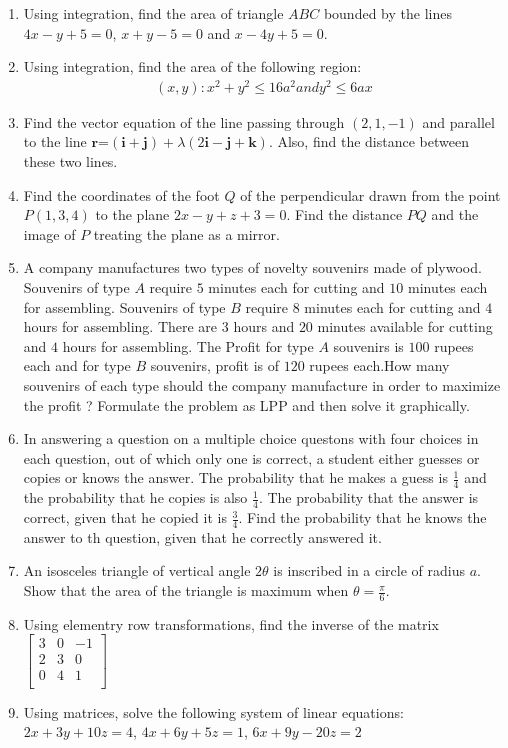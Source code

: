 \documentclass[12pt,-letter paper]{article}
\let\vec\mathbf{}
\let\vec\mathbf{}
\let\vec\mathbf{}
\begin{document}
\begin{enumerate}
\item Using integration, find the area of triangle $ABC$ bounded by the lines $4x-y+5=0$, $x+y-5=0$ and $x-4y+5=0$.

\item Using integration, find the area of the following region:\begin{align*}{(x,y): x^2+y^2\leq 16a^2} and {y^2 \leq 6ax}\end{align*}		

\item Find the vector equation of the line passing through $(2,1,-1)$ and parallel to the line $\vec{r}$=$(\vec{i}+\vec{j})+\lambda(2\vec{i}-\vec{j}+\vec{k})$. Also, find the distance between these two lines.
	
\item Find the coordinates of the foot $Q$ of the perpendicular drawn from the point $P(1,3,4)$ to the plane $2x-y+z+3=0$. Find the distance $PQ$ and the image of $P$ treating the plane as a mirror.

\item A company manufactures two types of novelty souvenirs made of plywood. Souvenirs of type $A$ require $5$ minutes each for cutting and $10$ minutes each for assembling. Souvenirs of type $B$ require $8$ minutes each for cutting and $4$ hours for assembling. There are $3$ hours and $20$ minutes available for cutting and $4$ hours for assembling. The Profit for type $A$ souvenirs is $100$ rupees each and for type $B$ souvenirs, profit is of $120$ rupees each.How many souvenirs of each type should the company manufacture in order to maximize the profit ? Formulate the problem as LPP and then solve it graphically.

\item In answering a question on a multiple choice questons with four choices in each question, out of which only one is correct, a student either guesses or copies or knows the answer. The probability that he makes a guess is $\frac{1}{4}$ and the probability that he copies is also $\frac{1}{4}$. The probability that the answer is correct, given that he copied it is $\frac{3}{4}$. Find the probability that he knows the answer to th question, given that he correctly answered it.

\item An isosceles triangle of vertical angle $2\theta$ is inscribed in a circle  of radius $a$. Show that the area of the triangle is maximum when $\theta =\frac{\pi}{6}$.

\item Using elementry row transformations, find the inverse of the matrix
		$\begin{bmatrix}
			3 & 0 &-1\\
			2 & 3 & 0\\
			0 & 4 &1\\
		\end{bmatrix}$

\item Using matrices, solve the following system of linear equations:
	$2x+3y+10z=4$,
	$4x+6y+5z=1$,
	$6x+9y-20z=2$



\end{enumerate}
\end{document}

